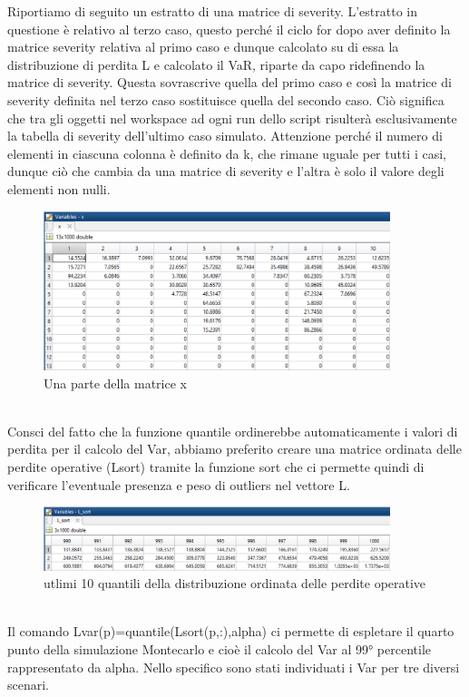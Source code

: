 \documentclass[titlepage]{article}
\begin{document}
\begin{itemize}
{Riportiamo di seguito un estratto di una matrice di severity. L’estratto in questione è relativo al terzo caso, questo perché il ciclo for dopo aver definito la matrice severity relativa al primo caso e dunque calcolato su di essa la distribuzione di perdita L e calcolato il VaR, riparte da capo ridefinendo la matrice di severity. Questa sovrascrive quella del primo caso e così la matrice di severity definita nel terzo caso sostituisce quella del secondo caso. Ciò significa che tra gli oggetti nel workspace ad ogni run dello script risulterà esclusivamente la tabella di severity dell’ultimo caso simulato. Attenzione perché il numero di elementi in ciascuna colonna è definito da k, che rimane uguale per tutti i casi, dunque ciò che cambia da una matrice di severity e l’altra è solo il valore degli elementi non nulli.
\\
\begin{figure}[top]
	\centering
	\includegraphics[width=0.9\textwidth]{severity.png}
	\caption{\label{fig:severity.png}Una parte della matrice x}
\end{figure}
\\
Consci del fatto che la funzione quantile ordinerebbe automaticamente i valori di perdita per il calcolo del Var, abbiamo preferito creare una matrice ordinata delle perdite operative (Lsort) tramite la funzione sort che ci permette quindi di verificare l’eventuale presenza e peso di outliers nel vettore L.\\



\begin{figure}[htbp]
	\centering
	\includegraphics[width=0.9\textwidth]{losss.png}
	\caption{\label{fig:losss.png}utlimi 10 quantili della distribuzione ordinata delle perdite operative}
\end{figure}
\\
Il comando Lvar(p)=quantile(Lsort(p,:),alpha) ci permette di espletare il quarto punto della simulazione Montecarlo e cioè il calcolo del Var al 99° percentile rappresentato da alpha. Nello specifico sono stati individuati i Var per tre diversi scenari. 
\\

}
\end{itemize}
\end{document}
